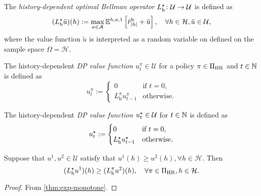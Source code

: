 \begin{definition}\label{def:DPhopt} 
The \emph{history-dependent optimal Bellman operator} $L_{\mathrm{h}}^{\star} \colon \mathcal{U} \to \mathcal{U}$ is defined as
  \[
    (L^{\star}_{\mathrm{h}} \tilde{u}) (h)
    :=
    \max_{a\in \mathcal{A}} \mathbb{E}^{h, a, 1} \left[ \tilde{r}^{\mathrm{h}}_{|h|} + \tilde{u} \right], \quad \forall h\in \mathcal{H}, \tilde{u} \in \mathcal{U},
  \]
  where the value function $\tilde{u}$ is interpreted as a random variable on defined on the sample space $\Omega = \mathcal{H}$.
\end{definition}

\begin{definition} \label{def:u-dp-pi}
  The history-dependent \emph{DP value function} $u_t^{\pi} \in \mathcal{U}$ for a policy $\pi\in \Pi_{\mathrm{HR}}$ and $t\in \mathbb{N}$ is defined as
  \[
   u_t^{\pi} :=
   \begin{cases}
     0 &\text{if } t = 0, \\
     L_{\mathrm{h}}^{\pi} u_{t-1}^{\pi} &\text{otherwise}.
   \end{cases}
 \]
\end{definition}

\begin{definition} \label{def:u-dp-opt}
  The history-dependent \emph{DP value function} $u_t^{\star} \in \mathcal{U}$ for $t\in \mathbb{N}$ is defined as
  \[
   u_t^{\star}  :=
   \begin{cases}
     0 &\text{if } t = 0, \\
     L_{\mathrm{h}}^{\star} u_{t-1}^{\star} &\text{otherwise}.
   \end{cases}
 \]
\end{definition}

\begin{lemma}\label{thm:dp-opt-ge-dp-pi}
  Suppose that $u^1, u^2 \in \mathcal{U}$ satisfy that $u^1(h) \ge u^2(h), \forall h\in \mathcal{H}$. Then
  \[
   (L_{\mathrm{h}}^{\star} u^1)(h) \ge  
   (L_{\mathrm{h}}^{\pi} u^2)(h), \quad \forall \pi\in \Pi_{\mathrm{HR}}, h\in \mathcal{H}.
  \]
\end{lemma}
\begin{proof}
  From \cref{thm:exp-monotone}.
\end{proof}

